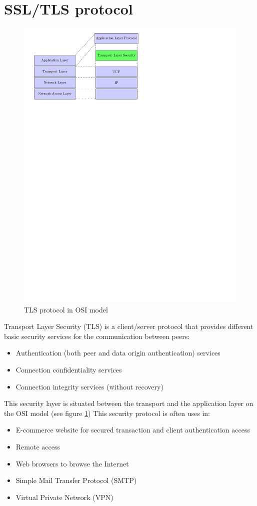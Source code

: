 \section{SSL/TLS protocol} %
\label{intro_tls}
\begin{figure}[!ht]
\centering
\includegraphics[trim=0cm 20cm 8cm 0cm]{figures/tls_osi.pdf}
\caption{TLS protocol in OSI model}
\label{fig:osi}
\end{figure}
Transport Layer Security (TLS) is a client/server protocol that provides
different basic security services for the communication between peers:
\begin{itemize}
  \item Authentication (both peer and data origin authentication)
  services
  \item Connection confidentiality services
  \item Connection integrity services (without recovery)
\end{itemize}
This security layer is situated between the transport and the application layer
on the OSI model (see figure \ref{fig:osi})
This security protocol is often uses in:
\begin{itemize}
  \item E-commerce website for secured transaction and client authentication
  access
  \item Remote access
  \item Web browsers to browse the Internet
  \item Simple Mail Transfer Protocol (SMTP)
  \item Virtual Private Network (VPN)
\end{itemize}

